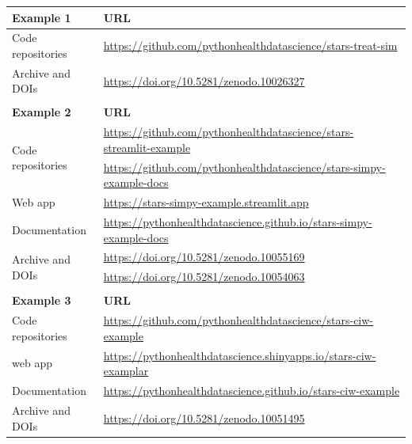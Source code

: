 \documentclass[]{interact}
\theoremstyle{plain}%
\theoremstyle{definition}
\theoremstyle{remark}
\begin{document}
\begin{table}[htp!]
{\begin{tabular}{ll}
\toprule
\textbf{Example 1}                 & \textbf{URL}                                                                               \\ \hline
Code repositories                  & \url{https://github.com/pythonhealthdatascience/stars-treat-sim}          \\ 
Archive and DOIs & \url{https://doi.org/10.5281/zenodo.10026327} \\
                                   & \\ \hline
\textbf{Example 2}                 & \textbf{URL}   \\ \hline
\multirow{2}{*}{Code repositories} & \url{https://github.com/pythonhealthdatascience/stars-streamlit-example}  \\  
                                   & \url{https://github.com/pythonhealthdatascience/stars-simpy-example-docs} \\ 
Web app                            & \url{https://stars-simpy-example.streamlit.app}                           \\ 
Documentation                      & \url{https://pythonhealthdatascience.github.io/stars-simpy-example-docs}  \\ 
                                  
\multirow{2}{*}{Archive and DOIs} & \url{https://doi.org/10.5281/zenodo.10055169}  \\  
                                   & \url{https://doi.org/10.5281/zenodo.10054063} \\ 
                                   & \\ \hline
\textbf{Example 3}                 & \textbf{URL}                                                                               \\ \hline
Code repositories                  & \url{https://github.com/pythonhealthdatascience/stars-ciw-example}        \\ 
web app                            & \url{https://pythonhealthdatascience.shinyapps.io/stars-ciw-examplar}     \\ 
Documentation                      & \url{https://pythonhealthdatascience.github.io/stars-ciw-example}         \\

Archive and DOIs & \url{https://doi.org/10.5281/zenodo.10051495}
\\ \hline
\end{tabular}}
\label{tab:artifacts}
\end{table}
\end{document}

